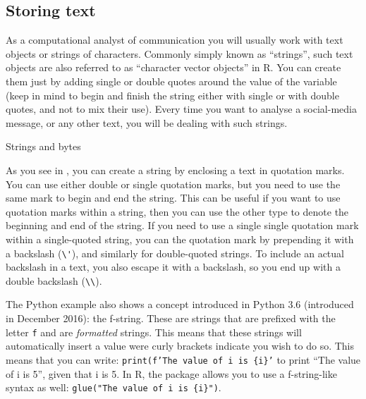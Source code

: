 



\subsection{Storing text}

As a computational analyst of communication you will usually work with
text objects or strings of characters. Commonly simply known as ``strings'',
such text objects are also referred to as ``character vector objects'' in R.
You can create them just by adding single or double quotes around the value of the variable (keep in mind to begin and finish the string either with single or with double quotes, and not to mix their use). Every time you want to analyse a social-media message, or any other text, you will be dealing with such strings. 

\begin{ccsexample}
  \caption{Strings and bytes}\label{ex:var4}
 \end{ccsexample}

As you see in , you can create a string by enclosing a text in quotation
marks. You can use either double or single quotation marks, but you
need to use the same mark to begin and end the string. This can be
useful if you want to use quotation marks within a string, then you can
use the other type to denote the beginning and end of the string.
If you need to use a single single quotation mark within a single-quoted string,
you can  the quotation mark by prepending it with a backslash (\verb|\'|),
and similarly for double-quoted strings.
To include an actual backslash in a text, you also escape it with a backslash,
so you end up with a double backslash (\verb|\\|). 

The Python example also shows a concept introduced in Python 3.6 (introduced in December 2016):
the f-string.  These are strings that are prefixed with the letter \texttt{f} and are \emph{formatted} strings. This means that these strings will automatically insert a value were curly brackets indicate you wish to do so. This means that you can write: \texttt{print(f'The value of i is \{i\}'} to print ``The value of i is 5'', given that i is 5.
In R, the  package allows you to use a f-string-like syntax as well: \texttt{glue("The value of i is \{i\}")}.

